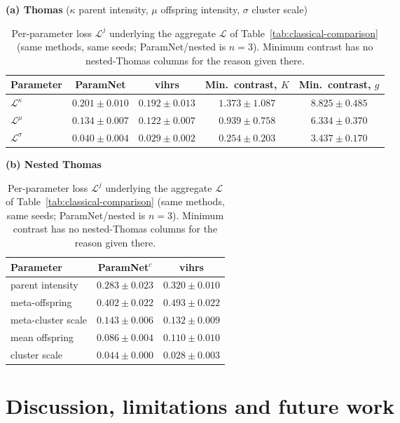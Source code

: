 \documentclass[11pt,a4paper]{article}
\begin{document}
\begin{table}[tbp]
\centering
\small
\textbf{(a) Thomas} ($\kappa$ parent intensity, $\mu$ offspring intensity, $\sigma$ cluster scale)\\[2pt]
\begin{tabular}{lcccc}
\toprule
Parameter & ParamNet & vihrs & Min.\ contrast, $K$ & Min.\ contrast, $g$ \\
\midrule
$\mathcal{L}^\kappa$ & $0.201 \pm 0.010$ & $0.192 \pm 0.013$ & $1.373 \pm 1.087$ & $8.825 \pm 0.485$ \\
$\mathcal{L}^\mu$    & $0.134 \pm 0.007$ & $0.122 \pm 0.007$ & $0.939 \pm 0.758$ & $6.334 \pm 0.370$ \\
$\mathcal{L}^\sigma$ & $0.040 \pm 0.004$ & $0.029 \pm 0.002$ & $0.254 \pm 0.203$ & $3.437 \pm 0.170$ \\
\bottomrule
\end{tabular}

\vspace{10pt}
\textbf{(b) Nested Thomas}\\[2pt]
\begin{tabular}{lcc}
\toprule
Parameter & ParamNet$^{c}$ & vihrs \\
\midrule
parent intensity      & $0.283 \pm 0.023$ & $0.320 \pm 0.010$ \\
meta-offspring        & $0.402 \pm 0.022$ & $0.493 \pm 0.022$ \\
meta-cluster scale    & $0.143 \pm 0.006$ & $0.132 \pm 0.009$ \\
mean offspring        & $0.086 \pm 0.004$ & $0.110 \pm 0.010$ \\
cluster scale         & $0.044 \pm 0.000$ & $0.028 \pm 0.003$ \\
\bottomrule
\end{tabular}
\caption{Per-parameter loss $\mathcal{L}^j$ underlying the aggregate
$\mathcal{L}$ of Table~\ref{tab:classical-comparison} (same methods, same
seeds; ParamNet/nested is $n{=}3$). Minimum contrast has no nested-Thomas
columns for the reason given there.}
\label{tab:perparam}
\end{table}

\section{Discussion, limitations and future work}
\label{sec:future}
\end{document}
